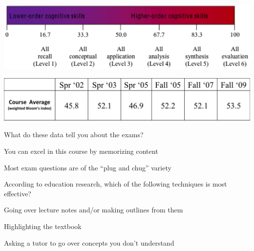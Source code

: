 \begin{noheadline}
\begin{frame}
    \centerline{
    \includegraphics[width=0.75\linewidth]{./bloom-scale.png}}
    
    \vspace{2mm}
    \centerline{
    \includegraphics[width=\linewidth]{./bloom-data.png}}
    \begin{clickerquestion}
        \item What do these data tell you about the exams?
        \begin{clickeroptions}
            \item You can excel in this course by memorizing content
            \item {}
            \item Most exam questions are of the ``plug and chug'' variety
            \item {}
        \end{clickeroptions}
    \end{clickerquestion}
\end{frame}
\end{noheadline}

\begin{noheadline}
\begin{frame}
    \begin{clickerquestion}
        \item According to education research, which of the following
            techniques is most effective?
        \begin{clickeroptions}
            \item Going over lecture notes and/or making outlines from them
            \item Highlighting the textbook
            \item {}
            \item Asking a tutor to go over concepts you don't understand
            \item {}
        \end{clickeroptions}
    \end{clickerquestion}
\end{frame}
\end{noheadline}

